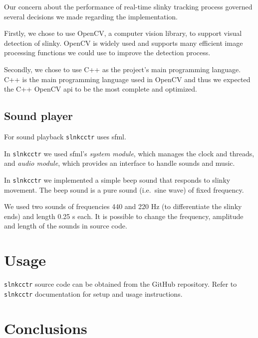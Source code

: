 \documentclass[fonts]{icst}
\newcommand{\slnkcctr}{\texttt{slnkcctr}}
\begin{document}
Our concern about the performance of real-time slinky tracking process
governed several decisions we made regarding the implementation.

Firstly, we chose to use OpenCV, a computer vision library,
to support visual detection of slinky.
OpenCV is widely used\cite{opencv:about}
and supports many efficient image processing functions
we could use to improve the detection process.

Secondly,
we chose to use C++ as the project's main programming language.
C++ is the main programming language used in OpenCV
and thus we expected the C++ OpenCV \acrshort{api}
to be the most complete and optimized.





\subsection{Sound player}

For sound playback \slnkcctr{} uses \acrfull{sfml}.

In \slnkcctr{} we used \acrshort{sfml}'s \emph{system module},
which manages the clock and threads,
and \emph{audio module},
which provides an interface to handle sounds and music.

In \slnkcctr{} we implemented a simple beep sound that responds to slinky movement.
The beep sound is a pure sound (i.e.~sine wave) of fixed frequency.

We used two sounds of frequencies 440 and 220 Hz
(to differentiate the slinky ends) and length 0.25 s each.
It is possible to change the frequency, amplitude and length
of the sounds in source code.

\section{Usage}

\slnkcctr{} source code can be obtained
from the GitHub repository\cite{filiboja:slnkcctr}.
Refer to \slnkcctr{} documentation\cite{bartek:slnkcctrreadme}
for setup and usage instructions.

\section{Conclusions}
\end{document}
